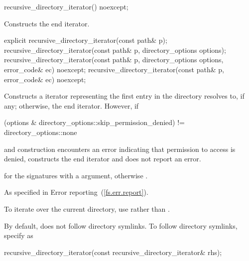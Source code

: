 \begin{itemdecl}
recursive_directory_iterator() noexcept;
\end{itemdecl}

\begin{itemdescr}

\pnum
\effects Constructs the end iterator.

\end{itemdescr}


\begin{itemdecl}
explicit recursive_directory_iterator(const path& p);
recursive_directory_iterator(const path& p, directory_options options);
recursive_directory_iterator(const path& p, directory_options options, error_code& ec) noexcept;
recursive_directory_iterator(const path& p, error_code& ec) noexcept;
\end{itemdecl}

\begin{itemdescr}

\pnum
\effects Constructs a iterator representing the first
entry in the directory  resolves to, if any; otherwise, the end iterator.
However, if
\begin{codeblock}
(options & directory_options::skip_permission_denied) != directory_options::none
\end{codeblock}
and construction encounters an error indicating
that permission to access  is denied, constructs the end iterator
and does not report an error.

\pnum
\postcondition {} for the signatures with a
 argument, otherwise .

\pnum
\throws As specified in Error reporting~(\ref{fs.err.report}).

\pnum
\enternote To iterate over the current directory, use 
 rather than . \exitnote

\pnum
\enternote By default,  does not
follow directory symlinks. To follow directory symlinks, specify  as
 \exitnote
\end{itemdescr}

\begin{itemdecl}
recursive_directory_iterator(const recursive_directory_iterator& rhs);
\end{itemdecl}

